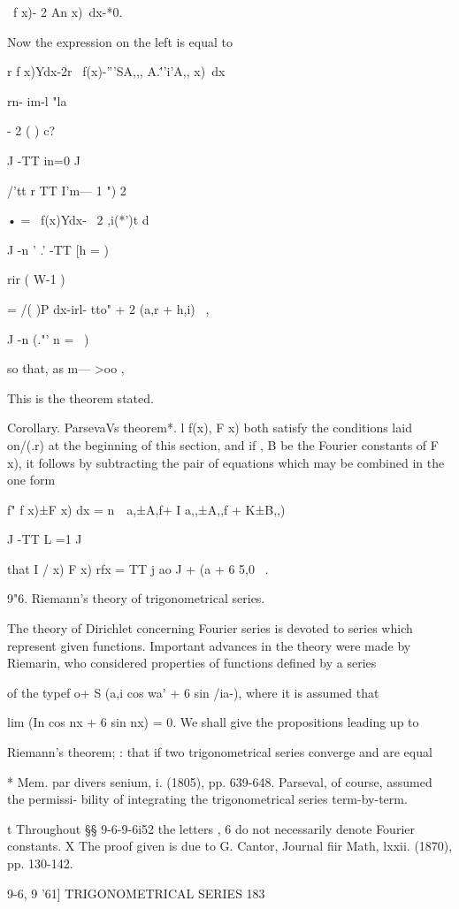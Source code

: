 \ f x)- 2 An x)\ dx-*0.

Now the expression on the left is equal to

r f x)Ydx-2r \ f(x)-'''SA,,, A.\'''i'A,, x)\ dx

rn- im-l "la

- 2 ( ) c?

J -TT in=0 J

/'tt r TT I'm— 1 ") 2

• = \ f(x)Ydx- \ 2 ,i(*')t d

J -n ' .' -TT [h = )

rir ( W-1 )

= /( )P dx-irl- tto" + 2 (a,r + h,i) \ ,

J -n (."' n = \ )

so that, as m— >oo ,

This is the theorem stated.

Corollary. ParsevaVs theorem*. l f(x), F x) both satisfy the
conditions laid on/(.r) at the beginning of this section, and if , B
be the Fourier constants of F x), it follows by subtracting the pair
of equations which may be combined in the one form

f" f x)±F x) dx = n\ \ a,±A,f+ I a,,±A,,f + K±B,,) \

J -TT L =1 J

that I / x) F x) rfx = TT j ao J + (a + 6 5,0 \ .

9"6. Riemann's theory of trigonometrical series.

The theory of Dirichlet concerning Fourier series is devoted to series
which represent given functions. Important advances in the theory were
made by Riemarin, who considered properties of functions defined by a
series

of the typef o+ S (a,i cos wa' + 6 sin /ia-), where it is assumed that

lim (In cos nx + 6 sin nx) = 0. We shall give the propositions leading
up to

Riemann's theorem; : that if two trigonometrical series converge and
are equal

* Mem. par divers senium, i. (1805), pp. 639-648. Parseval, of course,
assumed the permissi- bility of integrating the trigonometrical series
term-by-term.

t Throughout §§ 9-6-9-6i52 the letters , 6 do not necessarily denote
Fourier constants. X The proof given is due to G. Cantor, Journal fiir
Math, lxxii. (1870), pp. 130-142.

9-6, 9 '61] TRIGONOMETRICAL SERIES 183

